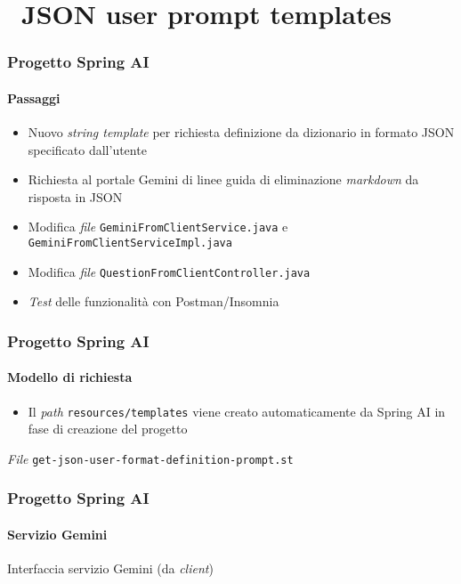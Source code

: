 \section{\faWrench\ JSON user prompt templates} %
\label{sec:spring-ai-gemini-json-user-format-prompt-templates}
%
\begin{frame}[t,fragile] \frametitle{Progetto Spring AI}
    \framesubtitle{Passaggi}
	\begin{itemize}[leftmargin=10pt,align=right]
		\item[\alertedcircled{1}] Nuovo \textit{string template} per richiesta definizione da dizionario in formato JSON specificato dall'utente
        \item[\alertedcircled{2}] Richiesta al portale Gemini di linee guida di eliminazione \textit{markdown} da risposta in JSON
        \item[\alertedcircled{3}] Modifica \textit{file} \texttt{GeminiFromClientService.java} e \texttt{GeminiFromClientServiceImpl.java}
        \item[\alertedcircled{4}] Modifica \textit{file} \texttt{QuestionFromClientController.java}
        \item[\alertedcircled{5}] \textit{Test} delle funzionalità con Postman/Insomnia
	\end{itemize}
\end{frame}
%
\begin{frame}[t,fragile] \frametitle{Progetto Spring AI}
    \framesubtitle{Modello di richiesta}
        \begin{itemize}[leftmargin=10pt,align=right]
		    \item[\alert{\faExclamationTriangle}] Il \textit{path} \texttt{resources/templates} viene creato automaticamente da Spring AI in fase di creazione del progetto
        \end{itemize}
        \begin{block}{\textit{File} \texttt{get-json-user-format-definition-prompt.st}}
			{\scriptsize}
    	\end{block}
\end{frame}
%
\begin{frame}[t,fragile] \frametitle{Progetto Spring AI}
    \framesubtitle{Servizio Gemini}
        \begin{block}{Interfaccia servizio Gemini (da \textit{client})}
{\tiny}
    \end{block}
\end{frame}
